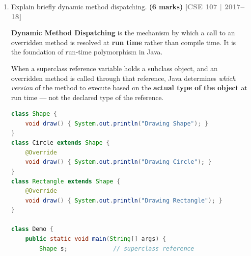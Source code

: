 \documentclass[12pt,a3paper]{article}
\newcommand{\yr}[1]{\hfill\textcolor{gray}{\small\textbf{[#1]}}}
\newcommand{\mk}[1]{\textcolor{orange!70!black}{\small\textbf{(#1 marks)}}}
\begin{document}
\begin{enumerate}
\begin{tcolorbox}[enhanced,breakable,ansbox,
  colback=cC!4,colframe=cC,boxrule=0.8pt,arc=5pt,
  title={\textbf{Answer --- Animal Hierarchy (Abstract Base Class)}},
  fonttitle=\bfseries\color{white},colbacktitle=cC]
\begin{lstlisting}[language=Java]
class AnimalHierarchy {
    public static void main(String[] args) {
        Bird    alex      = new Albatross("Alex", 39);
        Mammal  spot      = new Dog("Spot", 7);
        Mammal  fred      = new FruitBat("Fred", 10);
        Reptile steph     = new EasternBrownSnake("Steph", 12);
        Fish    bruce     = new GreatWhiteShark("Bruce", 40);
        Arachnid charlotte= new RedBackSpider("Charlotte", 1);

        Animal[] animals  = {alex, spot, fred, steph, bruce, charlotte};

        for (Animal a : animals)
            System.out.println(a);
    }
}
\end{lstlisting}
\textbf{Output:}
\begin{verbatim}
Albatross("Alex", 39)
Dog("Spot", 7)
FruitBat("Fred", 10)
EasternBrownSnake("Steph", 12)
GreatWhiteShark("Bruce", 40)
RedBackSpider("Charlotte", 1)
\end{verbatim}
\end{tcolorbox}

\item Explain briefly dynamic method dispatching. \mk{6}
\yr{CSE 107 | 2017--18}

\begin{tcolorbox}[enhanced,breakable,ansbox,
  colback=cC!4,colframe=cC,boxrule=0.8pt,arc=5pt,
  title={\textbf{Answer --- Dynamic Method Dispatching}},
  fonttitle=\bfseries\color{white},colbacktitle=cC]

\textbf{Dynamic Method Dispatching} is the mechanism by which a call
to an overridden method is resolved at \textbf{run time} rather than
compile time. It is the foundation of run-time polymorphism in Java.

When a superclass reference variable holds a subclass object, and an
overridden method is called through that reference, Java determines
\emph{which version} of the method to execute based on the
\textbf{actual type of the object} at run time --- not the declared
type of the reference.

\begin{lstlisting}[language=Java]
class Shape {
    void draw() { System.out.println("Drawing Shape"); }
}
class Circle extends Shape {
    @Override
    void draw() { System.out.println("Drawing Circle"); }
}
class Rectangle extends Shape {
    @Override
    void draw() { System.out.println("Drawing Rectangle"); }
}

class Demo {
    public static void main(String[] args) {
        Shape s;             // superclass reference


\end{lstlisting}
\end{tcolorbox}
\end{enumerate}
\end{document}
